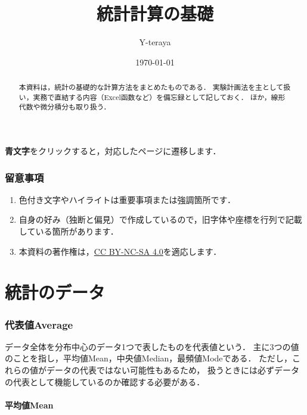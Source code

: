 \documentclass[a4paper,11pt]{ltjsarticle}
\title{\textbf{統計計算の基礎}}
\author{Y-teraya}
\date{\today}
\begin{document}
\maketitle

\begin{abstract}
  本資料は，統計の基礎的な計算方法をまとめたものである．
  実験計画法を主として扱い，実務で直結する内容（Excel函数など）を備忘録として記しておく．
  ほか，線形代数や微分積分も取り扱う．
\end{abstract}

\tableofcontents

\vspace{12pt}

\begin{center}
  \textbf{\color{blue}青文字}をクリックすると，対応したページに遷移します．
\end{center}

\clearpage

\section*{留意事項}

\begin{enumerate}
  \item 色付き文字やハイライトは重要事項または強調箇所です．
  \item 自身の好み（独断と偏見）で作成しているので，旧字体や座標を行列で記載している箇所があります．
  \item 本資料の著作権は，\href{https://creativecommons.org/licenses/by-nc-sa/4.0}{CC BY-NC-SA 4.0}を適応します．
\end{enumerate}

\clearpage

\part{統計のデータ}
\label{part: statics}

\section{代表値Average}
\label{sec: average}

データ全体を分布中心のデータ1つで表したものを代表値という．
主に3つの値のことを指し，平均値Mean，中央値Median，最頻値Modeである．
ただし，これらの値がデータの代表ではない可能性もあるため，
扱うときには必ずデータの代表として機能しているのか確認する必要がある．

\subsection{平均値Mean}
\label{sec: mean}
\end{document}
